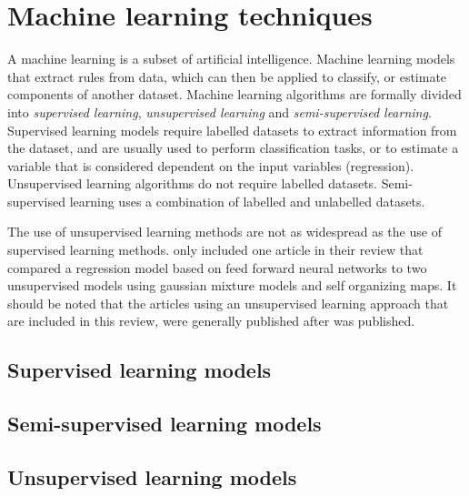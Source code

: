 \section{Machine learning techniques}
A machine learning is a subset of artificial intelligence. Machine learning models that extract rules from data, which can then be applied to classify, or estimate components of another dataset. Machine learning algorithms are formally divided into \textit{supervised learning}, \textit{unsupervised learning} and \textit{semi-supervised learning}. Supervised learning models require labelled datasets to extract information from the dataset, and are usually used to perform classification tasks, or to estimate a variable that is considered dependent on the input variables (regression). Unsupervised learning algorithms do not require labelled datasets. Semi-supervised learning uses a combination of labelled and unlabelled datasets. \bigskip


The use of unsupervised learning methods are not as widespread as the use of supervised learning methods. \textcite{ml_for_wt_cond_monit_rev} only included one article in their review that compared a regression model based on feed forward neural networks to two unsupervised models using gaussian mixture models and self organizing maps. It should be noted that the articles using an unsupervised learning approach that are included in this review, were generally published after \cite{ml_for_wt_cond_monit_rev} was published.

\subsection{Supervised learning models}

\subsection{Semi-supervised learning models}

\subsection{Unsupervised learning models}